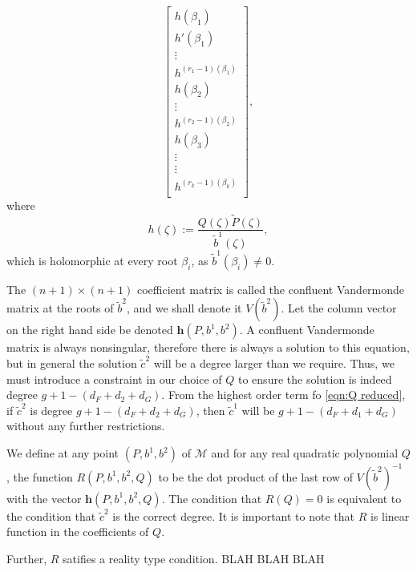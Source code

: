 \[\begin{bmatrix}
h(β_1) \\ h'(β_1) \\ \vdots \\ h^{(r_1-1)(β_1)} \\
h(β_2) \\ \vdots \\ h^{(r_2-1)(β_2)} \\
h(β_3) \\ \vdots \\ \vdots \\ h^{(r_k-1)(β_k)} \\
\end{bmatrix},
\]
where
\[
h(ζ) := \frac{Q(ζ)\tilde{P}(ζ)}{\tilde{b}^1(ζ)},
\]
which is holomorphic at every root $β_i$, as $\tilde{b}^1(β_i)\neq 0$.

The $(n+1)\times (n+1)$ coefficient matrix is called the confluent Vandermonde matrix at the roots of $\tilde{b}^2$, and we shall denote it $V(\tilde{b}^2)$. Let the column vector on the right hand side be denoted $\mathbf{h}(P,b^1,b^2)$. A confluent Vandermonde matrix is always nonsingular, therefore there is always a solution to this equation, but in general the solution $\tilde{c}^2$ will be a degree larger than we require. Thus, we must introduce a constraint in our choice of $Q$ to ensure the solution is indeed degree $g + 1 - (d_F + d_2 + d_G)$. From the highest order term fo \eqref{eqn:Q reduced}, if $\tilde{c}^2$ is degree $g + 1 - (d_F + d_2 + d_G)$, then $\tilde{c}^1$ will be $g + 1 - (d_F + d_1 + d_G)$ without any further restrictions.

We define at any point $(P,b^1,b^2)$ of $\mathcal{M}$ and for any real quadratic polynomial $Q$, the function $R(P,b^1,b^2,Q)$ to be the dot product of the last row of $V(\tilde{b}^2)^{-1}$ with the vector $\mathbf{h}(P,b^1,b^2,Q)$. The condition that $R(Q) = 0$ is equivalent to the condition that $\tilde{c}^2$ is the correct degree. It is important to note that $R$ is linear function in the coefficients of $Q$.

Further, $R$ satifies a reality type condition. BLAH BLAH BLAH

